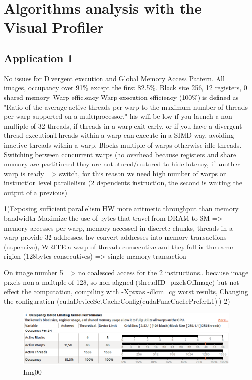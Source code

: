 \documentclass[a4paper]{article}
\begin{document}
\section{Algorithms analysis with the Visual Profiler}
\label{sec:vp}

\subsection{Application 1}
\label{sec:a1}
No issues for Divergent execution and Global Memory Access Pattern. All images, occupancy over 91\% except the first 82.5\%. Block size 256, 12 registers, 0 shared memory. Warp efficiency 
Warp execution efficiency (100\%) is defined as "Ratio of the average active threads per warp to the maximum number of threads per warp supported on a multiprocessor." his will be low if you launch a non-multiple of 32 threads, if threads in a warp exit early, or if you have a divergent thread executionThreads within a warp can execute in a SIMD way, avoiding inactive threads within a warp.
Blocks multiple of warps otherwise idle threads. Switching between concurrent warps (no overhead because registers and share memory are partitioned they are not stored/restored  to hide latency, if another warp is ready => switch, for this reason we need high number of warps or instruction level parallelism (2 dependents instruction, the second is waiting the output of a previous)

1)Exposing sufficient parallelism
HW more aritmetic throughput than memory bandwidth
Maximize the use of bytes that travel from DRAM to SM => memory accesses per warp, memory accessed in discrete chunks, threads in a warp provide 32 addresses, hw convert addresses into memory transactions (expensive), 
WRITE
a warp of threads consecutive and they fall in the same rigion (128bytes consecutives) => single memory transaction

On image number 5 => no coalesced access for the 2 instructions.. because image pixels non a multiple of 128, so non aligned (threadID+pizelsOfImage) but not effect the computation, compiling with -Xptxas -dlcm=cg worst results, Changing the configuration (cudaDeviceSetCacheConfig(cudaFuncCachePreferL1);)
2) 

\begin{figure}[ht]
    \centering
    \includegraphics[width=0.7\linewidth]{profiling/darker/darker_occupancy_00}
    \caption{Img00}
    \label{fig:histo}
\end{figure}
\FloatBarrier
\end{document}
